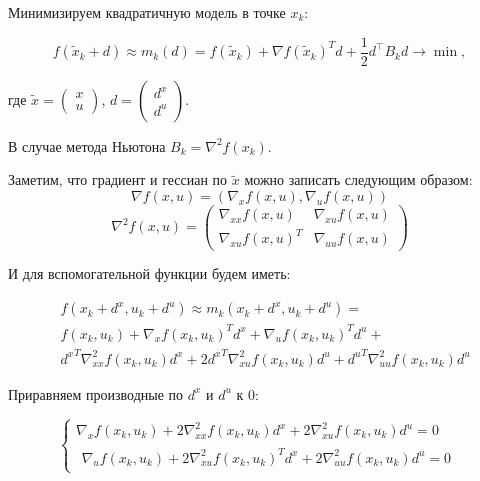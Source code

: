 \documentclass[11pt]{article}
\begin{document}
Минимизируем  квадратичную модель в точке $x_k$:

$$
f \left( \tilde{x}_{k}+d \right) \approx m_{k}(d) = f \left(\tilde{x}_{k}\right)+\nabla f\left(\tilde{x}_{k}\right)^{T} d+\frac{1}{2} d^{\top} B_{k} d \rightarrow \min,$$

где $\tilde{x} = \begin{pmatrix} x \\ u \end{pmatrix}$, $d = \begin{pmatrix} d^x \\ d^u \end{pmatrix}$.

В случае метода Ньютона $B_k = \nabla^2 f\left( x_{k} \right)$.

Заметим, что градиент и гессиан по $\tilde{x}$ можно записать следующим образом:
$$\nabla f(x, u) = \left( \nabla_x f(x, u), \nabla_u f(x, u) \right)$$
$$
\nabla^2 f(x, u) = 
\left( 
\begin{array}{cc} 
\nabla_{xx} f(x, u) & \nabla_{xu} f(x, u) \\ 
{\nabla_{xu} f(x, u)}^T & \nabla_{uu} f(x, u)
\end{array} 
\right)
$$

И для вспомогательной функции будем иметь:

\begin{equation*}
\begin{split}
& f \left( x_k+d^x, u_k + d^u \right)  \approx m_{k}(x_k+d^x, u_k + d^u) =  \\
& f \left(x_k, u_k \right) + \nabla_{x}  f\left(x_k, u_k\right)^{T} d^x + \nabla_{u} f\left(x_k, u_k\right)^{T}  d^u + \\
& {d^x}^T \nabla_{xx}^2 f\left(x_k, u_k\right) d^x + 2 {d^x}^T \nabla_{xu}^2 f\left(x_k, u_k\right) d^u + {d^u}^T \nabla_{uu}^2 f \left( x_k, u_k \right)  d^u
  \end{split}
\end{equation*}

Приравняем производные по $d^x$ и $d^u$ к 0:

\begin{equation*}
\begin{cases} 
\nabla_{x}  f\left(x_k, u_k\right) + 2 \nabla_{xx}^2 f\left(x_k, u_k\right) d^x + 2 {\nabla_{xu}^2 f\left(x_k, u_k\right)} d^u = 0
\\
\begin{split}
\nabla_{u} f\left(x_k, u_k\right) + 2 \nabla_{xu}^2 f\left(x_k, u_k\right)^T d^x + 2  \nabla_{uu}^2 f \left( x_k, u_k \right) d^u = 0
  \end{split}
\end{cases} 
\end{equation*}
\end{document}
